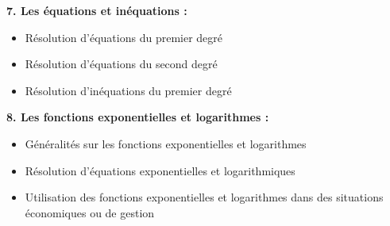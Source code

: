 \documentclass{article}
\begin{document}
\textbf{7. Les équations et inéquations :}
\begin{itemize}
\item Résolution d'équations du premier degré
\item Résolution d'équations du second degré
\item Résolution d'inéquations du premier degré
\end{itemize}

\textbf{8. Les fonctions exponentielles et logarithmes :}
\begin{itemize}
\item Généralités sur les fonctions exponentielles et logarithmes
\item Résolution d'équations exponentielles et logarithmiques
\item Utilisation des fonctions exponentielles et logarithmes dans des situations économiques ou de gestion
\end{itemize}
\end{document}
